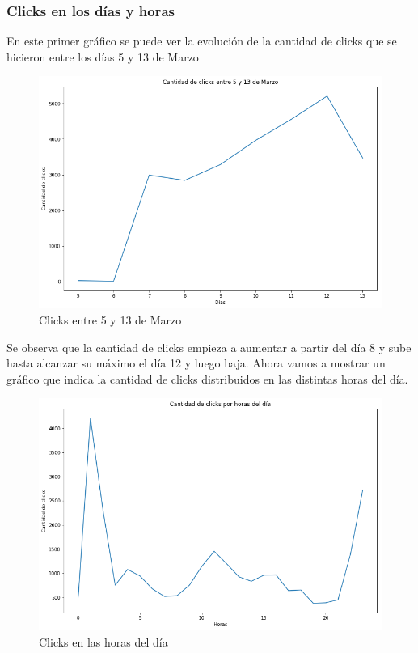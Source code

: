 \documentclass[a4paper, 12pt]{article}
\begin{document}
	\subsubsection{Clicks en los días y horas}
		En este primer gráfico se puede ver la evolución de la cantidad de clicks que se hicieron entre los días 5 y 13 de Marzo

		\FloatBarrier
		\begin{figure}[h]
			\centering
			\includegraphics[width=\textwidth]{images/clicks/clicks_days.png}
			\caption{Clicks entre 5 y 13 de Marzo}
		\end{figure}
		\FloatBarrier

		 Se observa que la cantidad de clicks empieza a aumentar a partir del día 8 y sube hasta alcanzar su máximo el día 12 y luego baja.
		\clearpage
		 Ahora vamos a mostrar un gráfico que indica la cantidad de clicks distribuidos en las distintas horas del día.

		\FloatBarrier
		\begin{figure}[h]
			\centering
			\includegraphics[width=\textwidth]{images/clicks/clicks_hours.png}
			\caption{Clicks en las horas del día}
		\end{figure}
		\FloatBarrier
		
\end{document}
